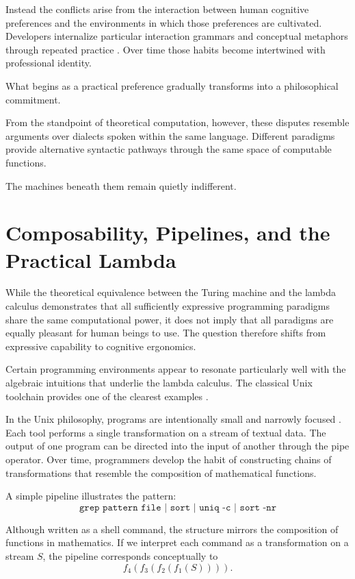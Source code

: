 \documentclass[11pt]{article}
\theoremstyle{definition}
\begin{document}
Instead the conflicts arise from the interaction between human cognitive
preferences and the environments in which those preferences are
cultivated. Developers internalize particular interaction grammars and
conceptual metaphors through repeated practice \cite{norman1988}. Over
time those habits become intertwined with professional identity.

What begins as a practical preference gradually transforms into a
philosophical commitment.

From the standpoint of theoretical computation, however, these disputes
resemble arguments over dialects spoken within the same language.
Different paradigms provide alternative syntactic pathways through the
same space of computable functions.

The machines beneath them remain quietly indifferent.

\section{Composability, Pipelines, and the Practical Lambda}

While the theoretical equivalence between the Turing machine and the
lambda calculus demonstrates that all sufficiently expressive
programming paradigms share the same computational power, it does not
imply that all paradigms are equally pleasant for human beings to use.
The question therefore shifts from expressive capability to cognitive
ergonomics.

Certain programming environments appear to resonate particularly well
with the algebraic intuitions that underlie the lambda calculus. The
classical Unix toolchain provides one of the clearest examples
\cite{ritchie1974,mcilroy1978}.

In the Unix philosophy, programs are intentionally small and narrowly
focused \cite{raymond2003}. Each tool performs a single transformation
on a stream of textual data. The output of one program can be directed
into the input of another through the pipe operator. Over time,
programmers develop the habit of constructing chains of transformations
that resemble the composition of mathematical functions.

A simple pipeline illustrates the pattern:
\[
\texttt{grep pattern file | sort | uniq -c | sort -nr}
\]

Although written as a shell command, the structure mirrors the
composition of functions in mathematics. If we interpret each command as
a transformation on a stream $S$, the pipeline corresponds conceptually
to
\[
f_4(f_3(f_2(f_1(S)))).
\]
\end{document}
